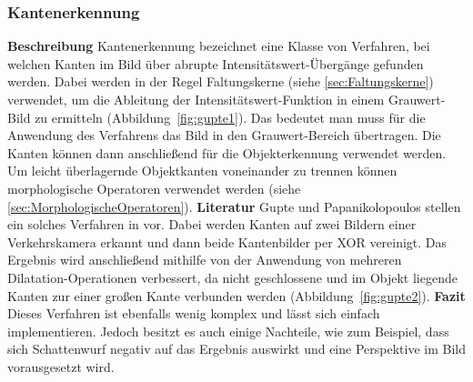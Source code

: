 \subsubsection{Kantenerkennung}
\textbf{Beschreibung}\newline
Kantenerkennung bezeichnet eine Klasse von Verfahren, bei welchen Kanten im Bild über abrupte Intensitätswert-Übergänge gefunden werden. 
Dabei werden in der Regel Faltungskerne (siehe \ref{sec:Faltungskerne}) verwendet, um die Ableitung der Intensitätswert-Funktion in einem Grauwert-Bild zu ermitteln (Abbildung~\ref{fig:gupte1}).
Das bedeutet man muss für die Anwendung des Verfahrens das Bild in den Grauwert-Bereich übertragen.
Die Kanten können dann anschließend für die Objekterkennung verwendet werden. Um leicht überlagernde Objektkanten voneinander zu trennen können morphologische Operatoren verwendet werden (siehe \ref{sec:MorphologischeOperatoren}).
\newline\newline
\textbf{Literatur}\newline
Gupte und Papanikolopoulos stellen ein solches Verfahren in \cite{gupte2000algorithms} vor. Dabei werden Kanten auf zwei Bildern einer Verkehrskamera erkannt und dann beide Kantenbilder per XOR vereinigt. Das Ergebnis wird anschließend mithilfe von der Anwendung von mehreren Dilatation-Operationen verbessert, da nicht geschlossene und im Objekt liegende Kanten zur einer großen Kante verbunden werden (Abbildung~\ref{fig:gupte2}).
\newline\newline
\textbf{Fazit}\newline
Dieses Verfahren ist ebenfalls wenig komplex und lässt sich einfach implementieren. 
Jedoch besitzt es auch einige Nachteile, wie zum Beispiel, dass sich Schattenwurf negativ auf das Ergebnis auswirkt und eine Perspektive im Bild vorausgesetzt wird.

